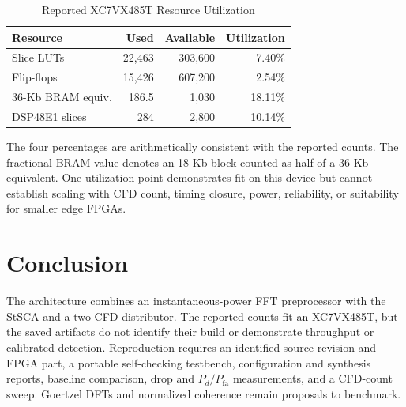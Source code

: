 \documentclass[conference]{IEEEtran}
\begin{document}
\begin{table}[!t]
\caption{Reported XC7VX485T Resource Utilization}
\label{tab:resources}
\centering
\begin{tabular}{lrrr}
\toprule
Resource & Used & Available & Utilization \\
\midrule
Slice LUTs & 22,463 & 303,600 & 7.40\% \\
Flip-flops & 15,426 & 607,200 & 2.54\% \\
36-Kb BRAM equiv. & 186.5 & 1,030 & 18.11\% \\
DSP48E1 slices & 284 & 2,800 & 10.14\% \\
\bottomrule
\end{tabular}
\end{table}

The four percentages are arithmetically consistent with the reported counts. The fractional BRAM value denotes an 18-Kb block counted as half of a 36-Kb equivalent. One utilization point demonstrates fit on this device but cannot establish scaling with CFD count, timing closure, power, reliability, or suitability for smaller edge FPGAs.

\section{Conclusion}
The architecture combines an instantaneous-power FFT preprocessor with the StSCA and a two-CFD distributor. The reported counts fit an XC7VX485T, but the saved artifacts do not identify their build or demonstrate throughput or calibrated detection. Reproduction requires an identified source revision and FPGA part, a portable self-checking testbench, configuration and synthesis reports, baseline comparison, drop and $P_d/P_{\mathrm{fa}}$ measurements, and a CFD-count sweep. Goertzel DFTs and normalized coherence remain proposals to benchmark.



\end{document}
